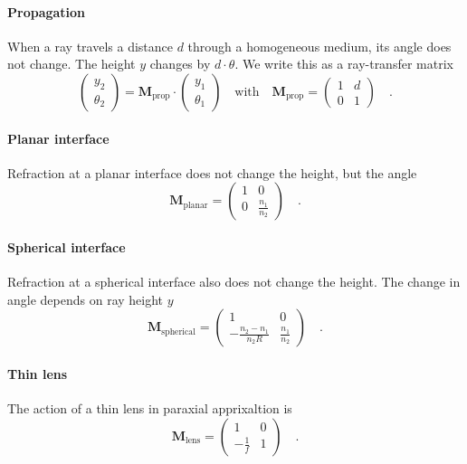 \paragraph*{Propagation} When a ray travels a distance $d$ through a homogeneous medium, its angle does not change. The height $y$ changes by $d \cdot \theta$. We write this as a ray-transfer matrix
\begin{equation}
    \begin{pmatrix}
        y_2 \\ \theta_2 
    \end{pmatrix}
    = 
    \boldsymbol{M}_\text{prop}
    \cdot
    \begin{pmatrix}
        y_1 \\ \theta_1 
    \end{pmatrix}
    \quad
    \text{with} \quad 
    \boldsymbol{M}_\text{prop} = 
    \begin{pmatrix}
        1 & d \\ 0 & 1
    \end{pmatrix} \quad .
\end{equation}

\paragraph*{Planar interface} Refraction at a planar interface does not change the height, but the angle
\begin{equation}
    \boldsymbol{M}_\text{planar} = 
    \begin{pmatrix}
        1 & 0 \\ 0 & \frac{ n_1 }{n_2}
    \end{pmatrix} \quad .
\end{equation}


\paragraph*{Spherical interface} Refraction at a spherical interface also does not change the height. The change in angle depends on ray height $y$
\begin{equation}
    \boldsymbol{M}_\text{spherical} = 
    \begin{pmatrix}
        1 & 0 \\ - \frac{n_2 - n_1}{n_2 R} &  \frac{ n_1 }{n_2}
    \end{pmatrix} \quad .
\end{equation}

\paragraph*{Thin lens} The action of a thin lens in paraxial apprixaltion is
\begin{equation}
    \boldsymbol{M}_\text{lens} = 
    \begin{pmatrix}
        1 & 0 \\ - \frac{1}{f} &  1
    \end{pmatrix} \quad .
\end{equation}


